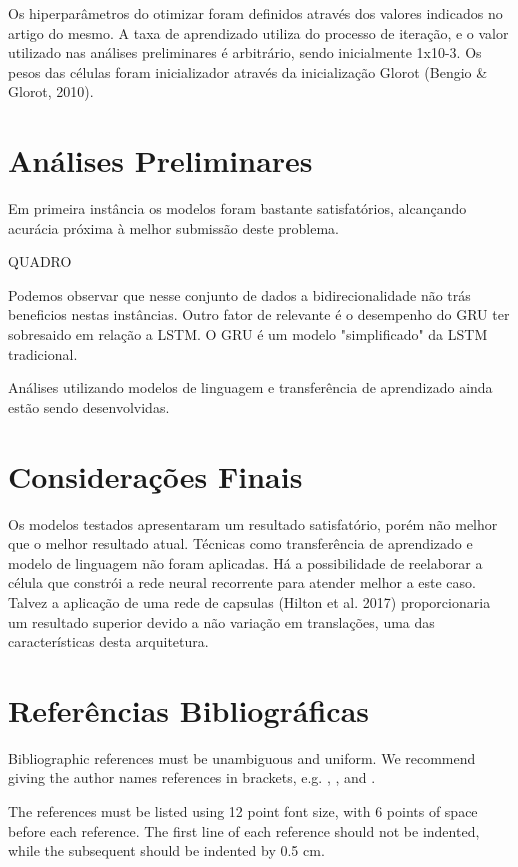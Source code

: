 \documentclass[12pt]{article}
\begin{document}
Os hiperparâmetros do otimizar foram definidos através dos valores indicados no artigo do mesmo. A taxa de aprendizado utiliza do processo de iteração, e o valor utilizado nas análises preliminares é arbitrário, sendo inicialmente 1x10-3. Os pesos das células foram inicializador através da inicialização Glorot (Bengio & Glorot, 2010).

\section{Análises Preliminares}

Em primeira instância os modelos foram bastante satisfatórios, alcançando acurácia próxima à melhor submissão deste problema.

QUADRO

Podemos observar que nesse conjunto de dados a bidirecionalidade não trás beneficios nestas instâncias. Outro fator de relevante é o desempenho do GRU ter sobresaido em relação a LSTM. O GRU é um modelo "simplificado" da LSTM tradicional.

Análises utilizando modelos de linguagem e transferência de aprendizado ainda estão sendo desenvolvidas.

\section{Considerações Finais}

Os modelos testados apresentaram um resultado satisfatório, porém não melhor que o melhor resultado atual. Técnicas como transferência de aprendizado e modelo de linguagem não foram aplicadas. Há a possibilidade de reelaborar a célula que constrói a rede neural recorrente para atender melhor a este caso. Talvez a aplicação de uma rede de capsulas (Hilton et al. 2017) proporcionaria um resultado superior devido a não variação em translações, uma das características desta arquitetura. 

\section{Referências Bibliográficas}

Bibliographic references must be unambiguous and uniform.  We recommend giving
the author names references in brackets, e.g. \cite{knuth:84},
\cite{boulic:91}, and \cite{smith:99}.

The references must be listed using 12 point font size, with 6 points of space
before each reference. The first line of each reference should not be
indented, while the subsequent should be indented by 0.5 cm.



\end{document}
